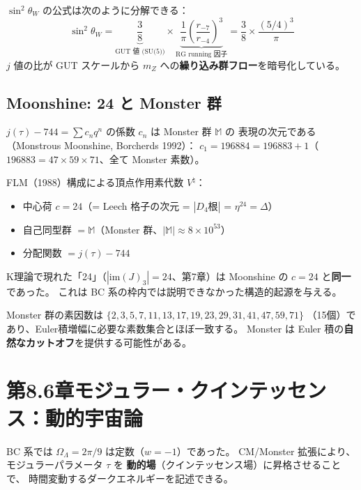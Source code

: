 $\sin^2\theta_W$ の公式は次のように分解できる：
\begin{equation}
  \sin^2\theta_W
  = \underbrace{\frac{3}{8}}_{\text{GUT 値 (SU(5))}}
  \times \underbrace{\frac{1}{\pi}\left(\frac{r_{-7}}{r_{-4}}\right)^{\!3}}_{\text{RG running 因子}}
  = \frac{3}{8} \times \frac{(5/4)^3}{\pi}
\end{equation}
$j$ 値の比が GUT スケールから $m_Z$ への\textbf{繰り込み群フロー}を暗号化している。

\subsection{Moonshine: 24 と Monster 群}

$j(\tau) - 744 = \sum c_n q^n$ の係数 $c_n$ は Monster 群 $\mathbb{M}$ の
表現の次元である（Monstrous Moonshine, Borcherds 1992）：
$c_1 = 196884 = 196883 + 1$（$196883 = 47 \times 59 \times 71$、全て Monster 素数）。

\begin{dfnbox}
FLM（1988）構成による頂点作用素代数 $V^\natural$：
\begin{itemize}
\item 中心荷 $c = 24$（= Leech 格子の次元 = $|D_4\text{根}|$ = $\eta^{24} = \Delta$）
\item 自己同型群 $= \mathbb{M}$（Monster 群、$|\mathbb{M}| \approx 8 \times 10^{53}$）
\item 分配関数 $= j(\tau) - 744$
\end{itemize}
\end{dfnbox}

\noindent
K理論で現れた「24」（$|\mathrm{im}(J)_3| = 24$、第7章）は
Moonshine の $c = 24$ と\textbf{同一}であった。
これは BC 系の枠内では説明できなかった構造的起源を与える。

Monster 群の素因数は $\{2, 3, 5, 7, 11, 13, 17, 19, 23, 29, 31, 41, 47, 59, 71\}$
（15個）であり、Euler積増幅に必要な素数集合とほぼ一致する。
Monster は Euler 積の\textbf{自然なカットオフ}を提供する可能性がある。


\section*{第8.6章\quad モジュラー・クインテッセンス：動的宇宙論}

BC 系では $\Omega_\Lambda = 2\pi/9$ は定数（$w = -1$）であった。
CM/Monster 拡張により、モジュラーパラメータ $\tau$ を
\textbf{動的場}（クインテッセンス場）に昇格させることで、
時間変動するダークエネルギーを記述できる。

